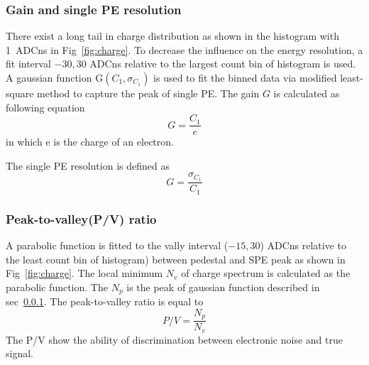 \subsubsection{Gain and single PE resolution}
\label{sec:noisegain}
There exist a long tail in charge distribution as shown in the histogram with \SI{1}{ADCns} in Fig~\ref{fig:charge}. To decrease the influence on the energy resolution, a fit interval $-30, 30$ ADCns relative to the largest count bin of histogram is used. A gaussian function G$(C_1,\sigma_{C_1})$ is used to fit the binned data via modified least-square method to capture the peak of single PE. The gain $G$ is calculated as following equation
\begin{equation}
    G=\frac{C_1}{e}
\end{equation}
in which e is the charge of an electron.

The single PE resolution is defined as
\begin{equation}
    G=\frac{\sigma_{C_1}}{C_1}
\end{equation}
\subsubsection{Peak-to-valley(P/V) ratio}
A parabolic function is fitted to the vally interval ($-15, 30$) ADCns relative to the least count bin of histogram) between pedestal and SPE peak as shown in Fig~\ref{fig:charge}. The local minimum $N_v$ of charge spectrum is calculated as the parabolic function. The $N_p$ is the peak of gaussian function described in sec~\ref{sec:noisegain}. The peak-to-valley ratio is equal to  
\begin{equation}
    P/V=\frac{N_p}{N_v}
\end{equation}
The P/V show the ability of discrimination between electronic noise and true signal.
